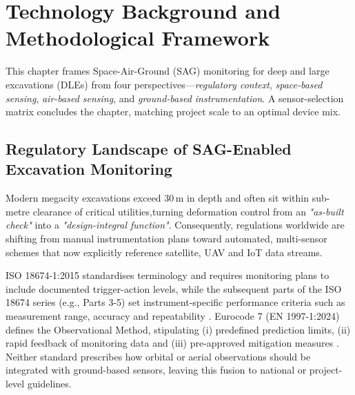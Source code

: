 \documentclass[preprint,11pt,authoryear,3p]{elsarticle}
\begin{document}
\section{Technology Background and Methodological Framework}

This chapter frames Space-Air-Ground (SAG) monitoring for deep and large excavations (DLEs) from four perspectives—\emph{regulatory context}, \emph{space-based sensing}, \emph{air-based sensing}, and \emph{ground-based instrumentation}. A sensor-selection matrix concludes the chapter, matching project scale to an optimal device mix.

\subsection{Regulatory Landscape of SAG-Enabled Excavation Monitoring}

Modern megacity excavations exceed 30\,m in depth and often sit within sub-metre clearance of critical utilities,turning deformation control from an \emph{"as-built check"} into a \emph{"design-integral function"}. Consequently, regulations worldwide are shifting from manual instrumentation plans toward automated, multi-sensor schemes that now explicitly reference satellite, UAV and IoT data streams.

ISO 18674-1:2015 standardises terminology and requires monitoring plans to include documented trigger-action levels, while the subsequent parts of the ISO 18674 series (e.g., Parts 3-5) set instrument-specific performance criteria such as measurement range, accuracy and repeatability \citep{ISO18674-1:2015, ISO18674-2:2016, ISO18674-3:2017, ISO18674-4:2020, ISO18674-5:2019, ISO18674-6:2025, ISO18674-7:2024, ISO18674-8:2023}. Eurocode 7 (EN 1997-1:2024) defines the Observational Method, stipulating (i) predefined prediction limits, (ii) rapid feedback of monitoring data and (iii) pre-approved mitigation measures \citep{EN1997-1:2024}. Neither standard prescribes how orbital or aerial observations should be integrated with ground-based sensors, leaving this fusion to national or project-level guidelines.
\end{document}
